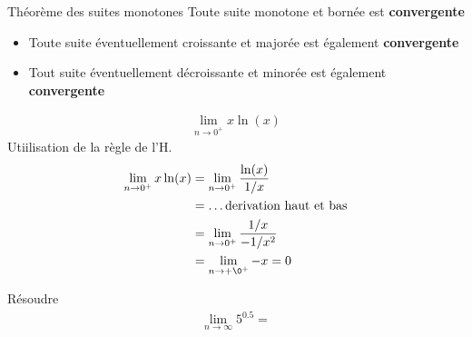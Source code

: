 \documentclass[16pt]{report}
\begin{document}
\begin{multicols*}{2}
    \begin{Theorem}{Théorème des suites monotones}{}
        Toute suite monotone et bornée est \textbf{convergente}  
    \end{Theorem}


    \begin{Lemme}{}{}
        \begin{itemize}
            \item Toute suite éventuellement croissante et majorée 
        est également \textbf{convergente}  
            \item Tout suite éventuellement décroissante et 
            minorée est également \textbf{convergente}  
        \end{itemize}
    
    \end{Lemme}

    \begin{align*}
        \lim\limits_{n\to 0^{+} }x\ln(x)
    \end{align*}
    Utiilisation de la règle de l'H. 
    \begin{align*}
                        \lim\limits_{n\to 0^{+} }x\ln(x)
                        &=         \lim\limits_{n\to 0^{+} }\frac{\ln(x)}
                        {1/x} \\ 
                        &= \dots \text{derivation haut et bas} \\
                        &=         \lim\limits_{n\to 0^{+} }\frac{1/x}{-1/x^2} \\
                        &= \lim\limits_{n\to+\0^+}-x  = 0 
    \end{align*}


    \begin{Exercice}{}{}
       Résoudre
       \begin{align*}
           \lim\limits_{n\to\infty}5^{0.5}=
       \end{align*}
    \end{Exercice}


    
    



\end{multicols*}
\end{document}
